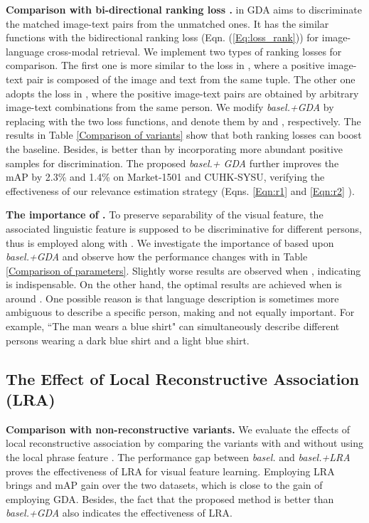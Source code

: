 \documentclass[runningheads]{llncs}
\begin{document}
 
  \noindent \textbf{Comparison with bi-directional ranking loss \cite{Dual-path, Karpathy:2014}.}  in GDA aims to discriminate the matched image-text pairs from the unmatched ones. It has the similar functions  with the bidirectional ranking loss  (Eqn. (\ref{Eq:loss_rank})) for image-language cross-modal retrieval.  We implement two types of ranking losses for comparison.  The first one is more similar to the loss in \cite{Karpathy:2014}, where a positive image-text pair is composed of the image and text from the same tuple. The other one adopts the loss in \cite{Dual-path}, where the positive image-text pairs are obtained by arbitrary image-text combinations from the same person.  We modify \emph{basel.+GDA} by replacing  with the two loss functions,  and denote them by  and , respectively. The results in Table \ref{Comparison of variants} show that both ranking losses can boost the baseline. Besides,  is better than  by incorporating more abundant positive samples for discrimination. The proposed \emph{basel.\!+\! GDA} further improves the mAP by 2.3\% and 1.4\% on Market-1501 and CUHK-SYSU, verifying the effectiveness of our relevance estimation strategy (Eqns. \ref{Eqn:r1} and \ref{Eqn:r2} ).
 
 


 
\noindent   \textbf{The importance of .} To preserve separability of the visual feature, the associated linguistic feature  is supposed to be discriminative for different persons, thus  is employed along with .  We investigate the importance of   based upon \emph{basel.+GDA} and observe how the performance changes with  in Table \ref{Comparison of parameters}. Slightly worse results are observed when , indicating  is indispensable. On the other hand, the optimal results are achieved when  is around . One possible reason is that language description is sometimes more ambiguous to describe a specific person, making  and  not equally important. For example, ``The man wears a blue shirt" can simultaneously describe different persons wearing a dark blue shirt and a light blue shirt. 






 
\subsection{The Effect of Local Reconstructive Association (LRA)} 

\textbf{Comparison with non-reconstructive variants.} We evaluate the effects of local reconstructive association by comparing the variants with and without using the local phrase feature . The performance gap between \emph{basel.} and \emph{basel.+LRA} proves the effectiveness of LRA for visual feature learning.  Employing LRA brings  and   mAP gain over the two datasets, which is close to the gain of employing GDA.  Besides, the fact that the proposed method is better than \emph{basel.+GDA} also indicates the effectiveness of LRA.
\end{document}
